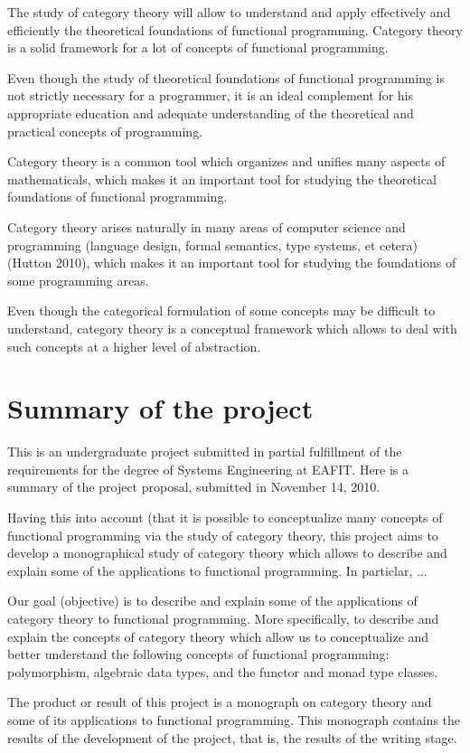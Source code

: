 The study of category theory will allow to understand and apply
effectively and efficiently the theoretical foundations of functional
programming. Category theory is a solid framework for a lot of
concepts of functional programming.

Even though the study of theoretical foundations of functional
programming is not strictly necessary for a programmer, it is an ideal
complement for his appropriate education and adequate understanding of
the theoretical and practical concepts of programming.

Category theory is a common tool which organizes and unifies many
aspects of mathematicals, which makes it an important tool for
studying the theoretical foundations of functional programming.

Category theory arises naturally in many areas of computer science and
programming (language design, formal semantics, type systems, et
cetera) (Hutton 2010), which makes it an important tool for studying
the foundations of some programming areas.

Even though the categorical formulation of some concepts may be
difficult to understand, category theory is a conceptual framework
which allows to deal with such concepts at a higher level of
abstraction.

\section*{Summary of the project}

This is an undergraduate project submitted in partial fulfillment of
the requirements for the degree of Systems Engineering at EAFIT. Here
is a summary of the project proposal, submitted in November 14, 2010.

Having this into account (that it is possible to conceptualize many
concepts of functional programming via the study of category theory,
this project aims to develop a monographical study of category theory
which allows to describe and explain some of the applications to
functional programming. In particlar, ...

Our goal (objective) is to describe and explain some of the
applications of category theory to functional programming. More
specifically, to describe and explain the concepts of category theory
which allow us to conceptualize and better understand the following
concepts of functional programming: polymorphism, algebraic data
types, and the functor and monad type classes.

The product or result of this project is a monograph on category
theory and some of its applications to functional programming. This
monograph contains the results of the development of the project, that
is, the results of the writing stage.


